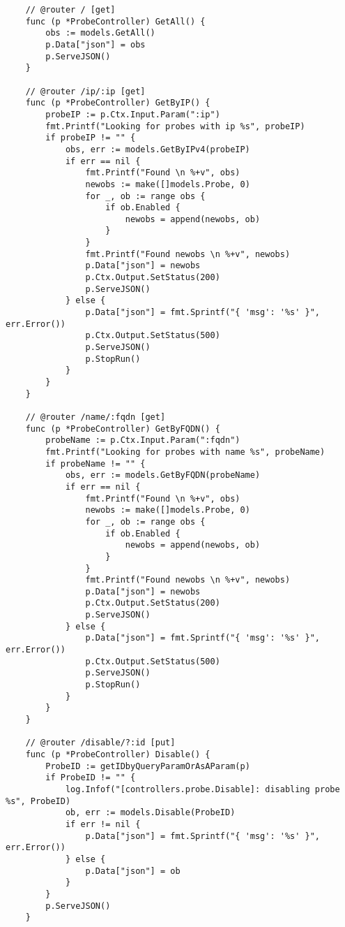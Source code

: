 \begin{verbatim}
    // @router / [get]
    func (p *ProbeController) GetAll() {
        obs := models.GetAll()
        p.Data["json"] = obs
        p.ServeJSON()
    }
    
    // @router /ip/:ip [get]
    func (p *ProbeController) GetByIP() {
        probeIP := p.Ctx.Input.Param(":ip")
        fmt.Printf("Looking for probes with ip %s", probeIP)
        if probeIP != "" {
            obs, err := models.GetByIPv4(probeIP)
            if err == nil {
                fmt.Printf("Found \n %+v", obs)
                newobs := make([]models.Probe, 0)
                for _, ob := range obs {
                    if ob.Enabled {
                        newobs = append(newobs, ob)
                    }
                }
                fmt.Printf("Found newobs \n %+v", newobs)
                p.Data["json"] = newobs
                p.Ctx.Output.SetStatus(200)
                p.ServeJSON()
            } else {
                p.Data["json"] = fmt.Sprintf("{ 'msg': '%s' }", err.Error())
                p.Ctx.Output.SetStatus(500)
                p.ServeJSON()
                p.StopRun()
            }
        }
    }
    
    // @router /name/:fqdn [get]
    func (p *ProbeController) GetByFQDN() {
        probeName := p.Ctx.Input.Param(":fqdn")
        fmt.Printf("Looking for probes with name %s", probeName)
        if probeName != "" {
            obs, err := models.GetByFQDN(probeName)
            if err == nil {
                fmt.Printf("Found \n %+v", obs)
                newobs := make([]models.Probe, 0)
                for _, ob := range obs {
                    if ob.Enabled {
                        newobs = append(newobs, ob)
                    }
                }
                fmt.Printf("Found newobs \n %+v", newobs)
                p.Data["json"] = newobs
                p.Ctx.Output.SetStatus(200)
                p.ServeJSON()
            } else {
                p.Data["json"] = fmt.Sprintf("{ 'msg': '%s' }", err.Error())
                p.Ctx.Output.SetStatus(500)
                p.ServeJSON()
                p.StopRun()
            }
        }
    }
    
    // @router /disable/?:id [put]
    func (p *ProbeController) Disable() {
        ProbeID := getIDbyQueryParamOrAsAParam(p)
        if ProbeID != "" {
            log.Infof("[controllers.probe.Disable]: disabling probe %s", ProbeID)
            ob, err := models.Disable(ProbeID)
            if err != nil {
                p.Data["json"] = fmt.Sprintf("{ 'msg': '%s' }", err.Error())
            } else {
                p.Data["json"] = ob
            }
        }
        p.ServeJSON()
    }
    

\end{verbatim}
